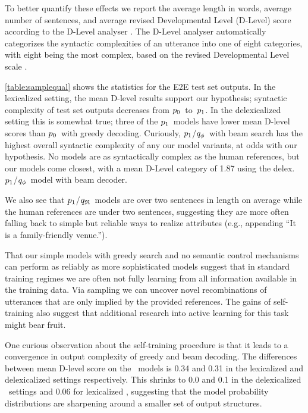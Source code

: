 To better quantify these effects we report the average length in words, 
average number of sentences, and average revised Developmental Level (D-Level)
score according to the D-Level analyser \cite{lu2009automatic}.
The D-Level analyser automatically categorizes the syntactic complexities 
of an utterance into one of eight categories, with eight being the most
complex, based on the revised Developmental Level scale \cite{rosenberg1987indicators,covington2006complex}.


\autoref{table:samplequal} shows the statistics for the E2E test set outputs. 
In the lexicalized setting, the mean D-level results support our hypothesis;
syntactic complexity of test set outputs decreases from $p_0$~to~$p_1$.
In the delexicalized setting this is somewhat true; three of 
the $p_1$~models have lower mean D-level scores than $p_0$~with 
greedy decoding. Curiously, $p_1$/${q_{\phi} }$~with beam search has the 
highest overall syntactic complexity of any our model variants, at odds
with our hypothesis.
No models are as syntactically complex as the human references, but our
models come closest, with a mean D-Level category of 1.87 using the delex. $p_1$/${q_{\phi} }$~model with beam decoder. %


We  also 
see that $p_1$/${q_{\mathfrak{R}} }$~models %
are over two sentences
in length on average while the human references are under two sentences,
suggesting they are more often falling back to simple but reliable
ways to realize attributes (e.g., appending ``It is a family-friendly venue.'').







That our simple models with greedy search and no semantic control mechanisms
can perform as reliably as more sophisticated models suggest that 
in standard training regimes we 
are often not fully learning from all information available in the 
training data. Via sampling we can uncover novel recombinations of 
utterances that are only implied by the provided references.
The gains of self-training also suggest that additional
research into active learning for this task might bear fruit.

One curious observation about the self-training procedure is that 
it leads to a convergence in output complexity of greedy and beam decoding.
The differences between mean D-level score on the \basegen~models is
0.34 and 0.31 in the lexicalized and delexicalized settings respectively.
This shrinks to 0.0 and 0.1 in the delexicalized \auggen~settings and 0.06 
for lexicalized \auggen, suggesting that the model probability distributions
are sharpening around a smaller set of output structures.







